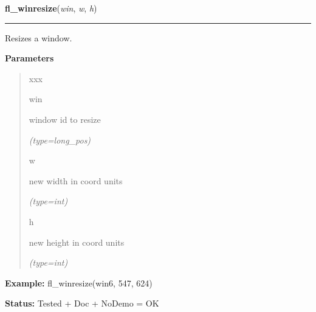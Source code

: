\hspace{.8\funcindent}\begin{boxedminipage}{\funcwidth}

    \raggedright \textbf{fl\_winresize}(\textit{win}, \textit{w}, \textit{h})

    \vspace{-1.5ex}

    \rule{\textwidth}{0.5\fboxrule}
\setlength{\parskip}{2ex}
    Resizes a window.

\setlength{\parskip}{1ex}
      \textbf{Parameters}
      \vspace{-1ex}

      \begin{quote}
        \begin{Ventry}{xxx}

          \item[win]

          window id to resize

            {\it (type=long\_pos)}

          \item[w]

          new width in coord units

            {\it (type=int)}

          \item[h]

          new height in coord units

            {\it (type=int)}

        \end{Ventry}

      \end{quote}

\textbf{Example:} fl\_winresize(win6, 547, 624)



\textbf{Status:} Tested + Doc + NoDemo = OK



    \end{boxedminipage}

    \label{xformslib:flxbasic:fl_winmove}

    \vspace{0.5ex}

